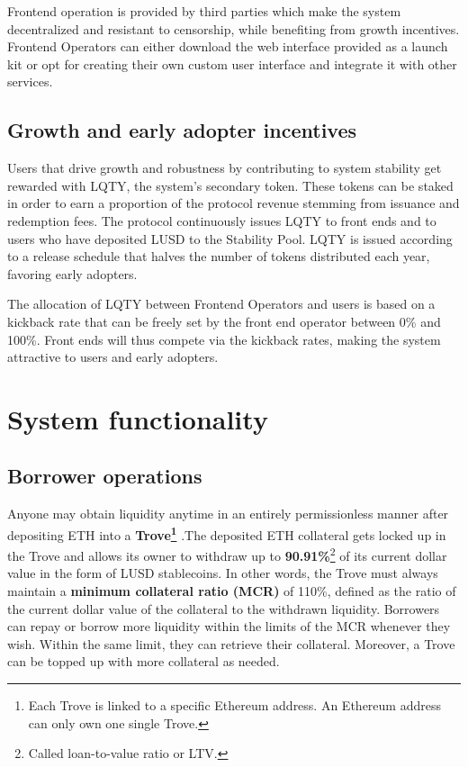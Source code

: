 \documentclass{article}
\begin{document}
Frontend operation is provided by third parties which make the system decentralized and resistant to censorship, while benefiting from growth incentives. Frontend Operators can either download the web interface provided as a launch kit or opt for creating their own custom user interface and integrate it with other services.

\subsection{Growth and early adopter incentives}
Users that drive growth and robustness by contributing to system stability get rewarded with LQTY, the system's secondary token. These tokens can be staked in order to earn a proportion of the protocol revenue stemming from issuance and redemption fees. The protocol continuously issues LQTY to front ends and to users who have deposited LUSD to the Stability Pool. LQTY is issued according to a release schedule that halves the number of tokens distributed each year, favoring early adopters.

The allocation of LQTY between Frontend Operators and users is based on a kickback rate that can be freely set by the front end operator between 0\% and 100\%. Front ends will thus compete via the kickback rates, making the system attractive to users and early adopters.

\section{System functionality}
\subsection{Borrower operations }
Anyone may obtain liquidity anytime in an entirely permissionless manner after depositing ETH into a \textbf{Trove\footnote{Each Trove is linked to a specific Ethereum address. An Ethereum address can only own one single Trove.} }.The deposited ETH collateral gets locked up in the Trove and allows its owner to withdraw up to \textbf{90.91\%}\footnote{Called loan-to-value ratio or LTV.} of its current dollar value in the form of LUSD stablecoins. In other words, the Trove must always maintain a \textbf{minimum collateral ratio (MCR)} of 110\%, defined as the ratio of the current dollar value of the collateral to the withdrawn liquidity. Borrowers can repay or borrow more liquidity within the limits of the MCR whenever they wish. Within the same limit, they can retrieve their collateral. Moreover, a Trove can be topped up with more collateral as needed. \\
\end{document}
